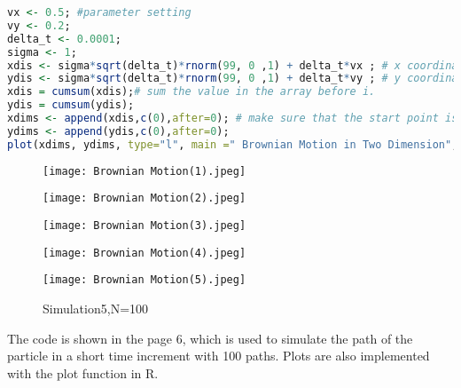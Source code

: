 \documentclass[twoside,11pt]{article}
\begin{document}
\begin{lstlisting}[language=R]
vx <- 0.5; #parameter setting
vy <- 0.2; 
delta_t <- 0.0001;
sigma <- 1;
xdis <- sigma*sqrt(delta_t)*rnorm(99, 0 ,1) + delta_t*vx ; # x coordinate
ydis <- sigma*sqrt(delta_t)*rnorm(99, 0 ,1) + delta_t*vy ; # y coordinate
xdis = cumsum(xdis);# sum the value in the array before i.
ydis = cumsum(ydis);
xdims <- append(xdis,c(0),after=0); # make sure that the start point is (0,0)
ydims <- append(ydis,c(0),after=0);
plot(xdims, ydims, type="l", main =" Brownian Motion in Two Dimension", xlab="x coordinate", ylab = "y coordinate"); # make a 2-dimensional plot.
\end{lstlisting}
\begin{figure}[ht]
    \centering
    \begin{minipage}[t]{0.45\textwidth}
    \centering
        \texttt{[image: Brownian Motion(1).jpeg]}
        \caption{Simulation1,N=100}
    \end{minipage}
    \begin{minipage}[t]{0.46\textwidth}
    \centering
        \texttt{[image: Brownian Motion(2).jpeg]}
        \caption{Simulation2,N=100}
    \end{minipage}
    \centering
    \begin{minipage}[t]{0.45\textwidth}
    \centering
        \texttt{[image: Brownian Motion(3).jpeg]}
        \caption{Simulation3,N=100}
    \end{minipage}
    \begin{minipage}[t]{0.46\textwidth}
    \centering
        \texttt{[image: Brownian Motion(4).jpeg]}
        \caption{Simulation4,N=100}
    \end{minipage}
    \begin{minipage}[t]{0.46\textwidth}
    \centering
        \texttt{[image: Brownian Motion(5).jpeg]}
        \caption{Simulation5,N=100}
    \end{minipage}
\end{figure}   
The code is shown in the page 6, which is used to simulate the path of the particle in a short time increment with 100 paths. Plots are also implemented with the plot function in R.
\end{document}
